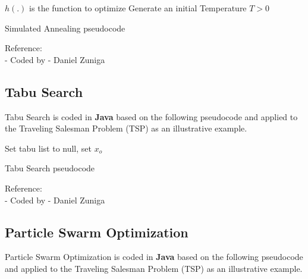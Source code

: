 \documentclass[10pt,bezier]{article}
\begin{document}
\begin{algorithm}[H]
\SetAlgoLined
{}
 $h(.)$ is the function to optimize\;
 Generate an initial Temperature $T > 0$ \;
 \caption{Simulated Annealing pseudocode}
\end{algorithm}

\noindent Reference:\\
- Coded by - Daniel Zuniga

\subsection{Tabu Search}\label{section6.2}
Tabu Search is coded in {\color{blue}\textbf{Java}} based on the following pseudocode and applied to the Traveling Salesman Problem (TSP) as an illustrative example.

\begin{algorithm}[H]
\SetAlgoLined
{}
 Set tabu list to null, set $x_o$\;
 \caption{Tabu Search pseudocode}
\end{algorithm}


\noindent Reference:\\
- Coded by - Daniel Zuniga

\newpage
\subsection{Particle Swarm Optimization}\label{section6.3}
Particle Swarm Optimization is coded in {\color{blue}\textbf{Java}} based on the following pseudocode and applied to the Traveling Salesman Problem (TSP) as an illustrative example.
\end{document}
